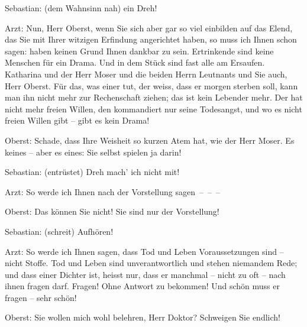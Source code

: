 \pstart
           Sebastian: (dem Wahnsinn nah)  ein Dreh!\pend
           
\pstart
           Arzt: Nun, Herr Oberst, wenn Sie sich aber gar so viel einbilden auf das Elend, das
               Sie mit Ihrer witzigen Erfindung angerichtet haben, so muss ich Ihnen schon sagen:
                   haben keinen Grund Ihnen dankbar zu sein.
               Ertrinkende sind keine Menschen für ein Drama. Und in dem Stück sind fast alle am
               Ersaufen. Katharina und der Herr Moser und die beiden Herrn Leutnants und Sie auch,
               Herr Oberst. Für das, was einer tut, der weiss, dass er morgen {\pb}sterben soll, kann man ihn nicht
               mehr zur Rechenschaft ziehen; das ist kein Lebender mehr. Der hat nicht mehr freien
               Willen, den kommandiert nur seine Todesangst, und wo es nicht freien Willen gibt –
               gibt es kein Drama!\pend
           
\pstart
           Oberst: Schade, dass Ihre Weisheit so kurzen Atem hat, wie der Herr Moser. Es \label{T_L01900-3v}\label{T_L01900-3} keines – aber es \label{T_L01900-4v}\label{T_L01900-4} eines: Sie selbst spielen ja darin!\pend
           
\pstart
           Sebastian: (entrüstet)  Dreh mach’ ich nicht mit!\pend
           
\pstart
           Arzt: So werde ich Ihnen nach der Vorstellung sagen – – –\pend
           
\pstart
           Oberst: Das können Sie nicht! Sie sind nur  der
               Vorstellung!\pend
           
\pstart
           Sebastian: (schreit) Aufhören!\pend
           
\pstart
           Arzt: So werde ich Ihnen sagen, dass Tod und Leben Voraussetzungen sind – nicht
               Stoffe. Tod und Leben sind unverantwortlich und stehen niemandem Rede; und dass einer
               Dichter ist, heisst nur, dass er manchmal – nicht zu oft – nach ihnen fragen darf.
               Fragen! Ohne Antwort zu bekommen! Und schön muss er fragen – sehr schön!\pend
           
\pstart
           Oberst: Sie wollen mich wohl belehren, Herr Doktor? Schweigen Sie endlich!\pend
           
